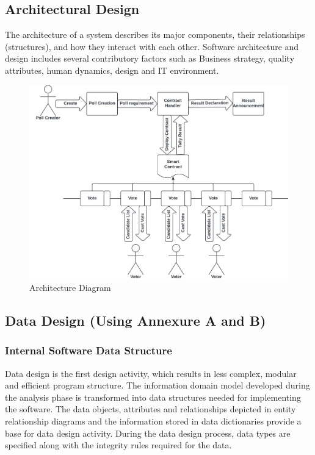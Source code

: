 \documentclass[oneside, 12pt]{book}
\begin{document}
		\subsection{Architectural Design}
			The architecture of a system describes its major components, their relationships (structures), and how they interact with each other. Software architecture and design includes several contributory factors such as Business strategy, quality attributes, human dynamics, design and IT environment.
			\begin{figure}[H]
				\centering
				\includegraphics[width=\linewidth]{./Resources/architecture.png}
			    \caption{Architecture Diagram}
			    \label{fig:architecture}
			\end{figure}
		\subsection{Data Design (Using Annexure A and B)}
			\subsubsection{Internal Software Data Structure}
				Data design is the first design activity, which results in less complex, modular and efficient program structure. The information domain model developed during the analysis phase is transformed into data structures needed for implementing the software. The data objects, attributes and relationships depicted in entity relationship diagrams and the information stored in data dictionaries provide a base for data design activity. During the data design process, data types are specified along with the integrity rules required for the data.
\end{document}
